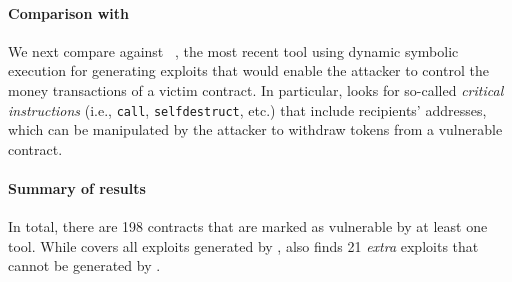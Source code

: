 \paragraph{\bf{Comparison with \teether}}\label{sec:teether}
We next compare \toolname against \teether~\cite{teether}, the most recent
tool using dynamic symbolic execution for generating exploits that would enable
the attacker to control the money transactions of a victim contract. In
particular, \teether looks for so-called \emph{critical instructions}
(i.e., \texttt{call}, \texttt{selfdestruct}, etc.) that include recipients' addresses, 
which can be manipulated by the attacker to withdraw
tokens from a vulnerable contract. 

\paragraph{Summary of results}

In total, there are 198 contracts that are marked as vulnerable by at
least one tool. While \toolname covers all exploits generated by
\teether, \toolname also finds 21 \emph{extra} exploits that cannot be generated
by \teether. 


